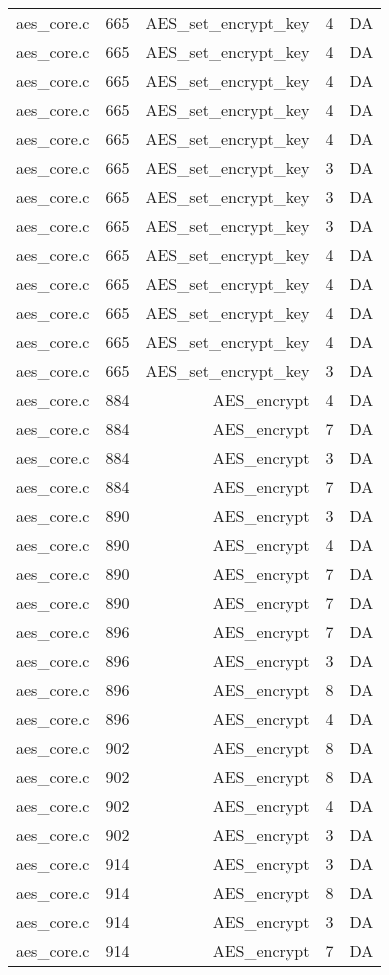 \begin{table}[h]
{\begin{tabular}{clrrr}
aes\_core.c&665&AES\_set\_encrypt\_key&4 &DA\\
aes\_core.c&665&AES\_set\_encrypt\_key&4 &DA\\
aes\_core.c&665&AES\_set\_encrypt\_key&4 &DA\\
aes\_core.c&665&AES\_set\_encrypt\_key&4 &DA\\
aes\_core.c&665&AES\_set\_encrypt\_key&4 &DA\\
aes\_core.c&665&AES\_set\_encrypt\_key&3 &DA\\
aes\_core.c&665&AES\_set\_encrypt\_key&3 &DA\\
aes\_core.c&665&AES\_set\_encrypt\_key&3 &DA\\
aes\_core.c&665&AES\_set\_encrypt\_key&4 &DA\\
aes\_core.c&665&AES\_set\_encrypt\_key&4 &DA\\
aes\_core.c&665&AES\_set\_encrypt\_key&4 &DA\\
aes\_core.c&665&AES\_set\_encrypt\_key&4 &DA\\
aes\_core.c&665&AES\_set\_encrypt\_key&3 &DA\\
aes\_core.c&884&AES\_encrypt&4 &DA\\
aes\_core.c&884&AES\_encrypt&7 &DA\\
aes\_core.c&884&AES\_encrypt&3 &DA\\
aes\_core.c&884&AES\_encrypt&7 &DA\\
aes\_core.c&890&AES\_encrypt&3 &DA\\
aes\_core.c&890&AES\_encrypt&4 &DA\\
aes\_core.c&890&AES\_encrypt&7 &DA\\
aes\_core.c&890&AES\_encrypt&7 &DA\\
aes\_core.c&896&AES\_encrypt&7 &DA\\
aes\_core.c&896&AES\_encrypt&3 &DA\\
aes\_core.c&896&AES\_encrypt&8 &DA\\
aes\_core.c&896&AES\_encrypt&4 &DA\\
aes\_core.c&902&AES\_encrypt&8 &DA\\
aes\_core.c&902&AES\_encrypt&8 &DA\\
aes\_core.c&902&AES\_encrypt&4 &DA\\
aes\_core.c&902&AES\_encrypt&3 &DA\\
aes\_core.c&914&AES\_encrypt&3 &DA\\
aes\_core.c&914&AES\_encrypt&8 &DA\\
aes\_core.c&914&AES\_encrypt&3 &DA\\
aes\_core.c&914&AES\_encrypt&7 &DA\\

\end{tabular}}
\end{table}

